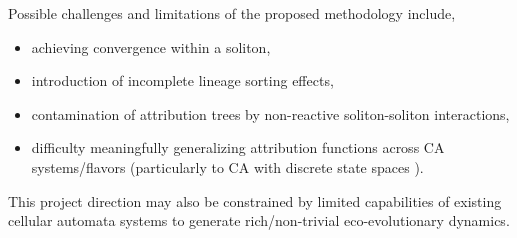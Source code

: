Possible challenges and limitations of the proposed methodology include,
\begin{itemize}
\item achieving convergence within a soliton,
\item introduction of incomplete lineage sorting effects,
\item contamination of attribution trees by non-reactive soliton-soliton interactions,
\item difficulty meaningfully generalizing attribution functions across CA systems/flavors (particularly to CA with discrete state spaces \citep{miotti2025differentiable}).
\end{itemize}

This project direction may also be constrained by limited capabilities of existing cellular automata systems to generate rich/non-trivial eco-evolutionary dynamics.
